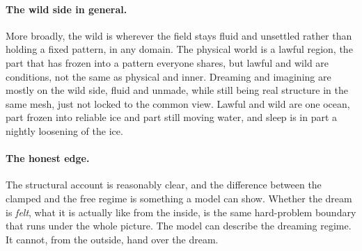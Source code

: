 \paragraph{The wild side in general.}
More broadly, the wild is wherever the field stays fluid and unsettled rather than holding a
fixed pattern, in any domain. The physical world is a lawful region, the part that has frozen
into a pattern everyone shares, but lawful and wild are conditions, not the same as physical and
inner. Dreaming and imagining are mostly on the wild side, fluid and unmade, while still being
real structure in the same mesh, just not locked to the common view. Lawful and wild are one
ocean, part frozen into reliable ice and part still moving water, and sleep is in part a nightly
loosening of the ice.

\paragraph{The honest edge.}
The structural account is reasonably clear, and the difference between the clamped and the free
regime is something a model can show. Whether the dream is \emph{felt}, what it is actually like
from the inside, is the same hard-problem boundary that runs under the whole picture. The model
can describe the dreaming regime. It cannot, from the outside, hand over the dream.
